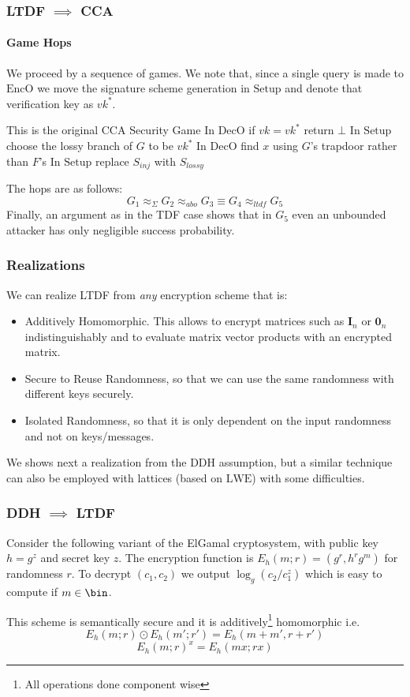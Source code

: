 \documentclass{beamer}
\begin{document}
\begin{frame}
    \frametitle{LTDF $\implies$ CCA}
    \framesubtitle{Game Hops}
    We proceed by a sequence of games. We note that, since a single query
    is made to $\mathrm{EncO}$ we move the signature scheme generation in
    $\mathrm{Setup}$ and denote that verification key as $vk^*$.
    \begin{gamedescription}[name=G]
        \describegame This is the original CCA Security Game
        \describegame In $\mathrm{DecO}$ if $vk=vk^*$ return $\bot$
        \describegame In $\mathrm{Setup}$ choose the lossy branch of $G$ to be $vk^*$
        \describegame In $\mathrm{DecO}$ find $x$ using $G$'s trapdoor rather than $F$'s
        \describegame In $\mathrm{Setup}$ replace $S_{inj}$ with $S_{lossy}$
    \end{gamedescription}
    The hops are as follows:
    \[ G_1 \approx_\Sigma G_2\approx_{abo} G_3 \equiv G_4 \approx_{ltdf} G_5 \]
    Finally, an argument as in the TDF case shows that in $G_5$ even an unbounded attacker has only
    negligible success probability.
\end{frame}
\begin{frame}
    \frametitle{Realizations}
    We can realize LTDF from \textit{any} encryption scheme that is:
    \begin{itemize}
        \item Additively Homomorphic. This allows to encrypt matrices such as $\mathbf{I}_n$ or $\mathbf{0}_n$ indistinguishably and to
              evaluate matrix vector products with an encrypted matrix.
        \item Secure to Reuse Randomness, so that we can use the same randomness with different keys securely.
        \item Isolated Randomness, so that it is only dependent on the input randomness and not on keys/messages.
    \end{itemize}
    We shows next a realization from the DDH assumption, but a similar technique
    can also be employed with lattices (based on $\mathrm{LWE}$) with some difficulties.
\end{frame}
\begin{frame}
    \frametitle{DDH $\implies$ LTDF}
    Consider the following variant of the ElGamal cryptosystem, with public key $h = g^z$ and secret key $z$.
    The encryption function is $E_h(m; r) = (g^r, h^r g^m)$ for randomness $r$. To decrypt $(c_1, c_2)$
    we output $\log_g(c_2/c_1^z)$ which is easy to compute if $m \in \bin$.

    This scheme is semantically secure and it is additively\footnote{All operations done component wise} homomorphic i.e.
    \[ E_h(m; r) \odot E_h(m'; r') = E_h(m + m', r + r')\]
    \[ E_h(m; r)^x = E_h(mx; rx) \]
\end{frame}
\end{document}
